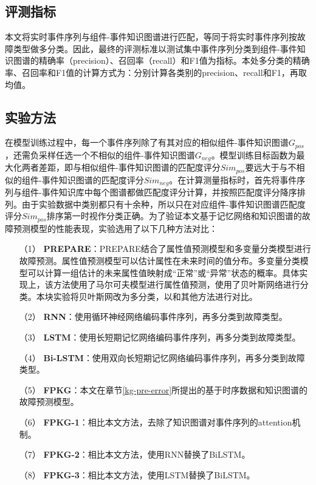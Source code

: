 \subsection{评测指标}

本文将实时事件序列与组件-事件知识图谱进行匹配，等同于将实时事件序列按故障类型做多分类。因此，最终的评测标准以测试集中事件序列分类到组件-事件知识图谱的精确率（precision）、召回率（recall）和F1值为指标。本处多分类的精确率、召回率和F1值的计算方式为：分别计算各类别的precision、recall和F1，再取均值。

\subsection{实验方法}

在模型训练过程中，每一个事件序列除了有其对应的相似组件-事件知识图谱$G_{pos}$，还需负采样任选一个不相似的组件-事件知识图谱$G_{neg}$。模型训练目标函数为最大化两者差距，即与相似组件-事件知识图谱的匹配度评分$Sim_{pos}$要远大于与不相似的组件-事件知识图谱的匹配度评分$Sim_{neg}$。在计算测量指标时，首先将事件序列与组件-事件知识库中每个图谱都做匹配度评分计算，并按照匹配度评分降序排列。由于实验数据中类别都只有十余种，所以只在对应组件-事件知识图谱匹配度评分$Sim_{pos}$排序第一时视作分类正确。为了验证本文基于记忆网络和知识图谱的故障预测模型的性能表现，实验选用了以下几种方法对比：
\begin{itemize}[itemsep=0 pt,topsep = 0 pt,parsep =0pt,partopsep=0pt]
    \item [（1）] 
    \textbf{PREPARE}\cite{tan2012prepare}：PREPARE结合了属性值预测模型和多变量分类模型进行故障预测。属性值预测模型可以估计属性在未来时间的值分布。多变量分类模型可以计算一组估计的未来属性值映射成“正常”或“异常”状态的概率。具体实现上，该方法使用了马尔可夫模型进行属性值预测，使用了贝叶斯网络进行分类。本块实验将贝叶斯网改为多分类，以和其他方法进行对比。
    \item [（2）]
    \textbf{RNN}\cite{xu2016health}：使用循环神经网络编码事件序列，再多分类到故障类型。
    \item [（3）]
    \textbf{LSTM}\cite{cheng2018machine,du2017deeplog,das2018desh,islam2017predicting,li2020predicting}：使用长短期记忆网络编码事件序列，再多分类到故障类型。
    \item [（4）]
    \textbf{Bi-LSTM}\cite{gao2020task}：使用双向长短期记忆网络编码事件序列，再多分类到故障类型。
    \item [（5）]
    \textbf{FPKG}：本文在章节\ref{kg-pre-error}所提出的基于时序数据和知识图谱的故障预测模型。
    \item [（6）]
    \textbf{FPKG-1}：相比本文方法，去除了知识图谱对事件序列的attention机制。
    \item [（7）]
    \textbf{FPKG-2}：相比本文方法，使用RNN替换了BiLSTM。
    \item [（8）]
    \textbf{FPKG-3}：相比本文方法，使用LSTM替换了BiLSTM。

\end{itemize}

